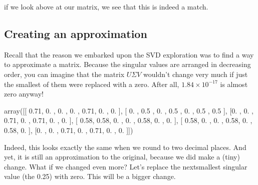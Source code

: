 \documentclass[letterpaper,10pt,english]{jupyterBook}
\begin{document}
\sphinxAtStartPar
if we look above at our  matrix, we see that this is indeed a match.


\subsection{Creating an approximation}
\label{\detokenize{chapter-16-matrices:creating-an-approximation}}
\sphinxAtStartPar
Recall that the reason we embarked upon the SVD exploration was to find a way to approximate a matrix.  Because the singular values are arranged in decreasing order, you can imagine that the matrix \(U\Sigma V\) wouldn’t change very much if just the smallest of them were replaced with a zero.  After all, \(1.84\times10^{-17}\) is almost zero anyway!

\begin{sphinxVerbatim}[commandchars=\\\{\}]
    
\PYG{p}{[}\PYG{p}{]}  
     
   
       
\end{sphinxVerbatim}

\begin{sphinxVerbatim}[commandchars=\\\{\}]
array([[ 0.71, \PYGZhy{}0.  , \PYGZhy{}0.  , \PYGZhy{}0.  ,  0.71, \PYGZhy{}0.  ,  0.  ],
       [ 0.  ,  0.5 ,  0.  ,  0.5 ,  0.  ,  0.5 ,  0.5 ],
       [\PYGZhy{}0.  , \PYGZhy{}0.  ,  0.71, \PYGZhy{}0.  ,  0.71, \PYGZhy{}0.  ,  0.  ],
       [ 0.58,  0.58, \PYGZhy{}0.  ,  0.  ,  0.58,  0.  ,  0.  ],
       [ 0.58,  0.  , \PYGZhy{}0.  ,  0.58, \PYGZhy{}0.  ,  0.58,  0.  ],
       [\PYGZhy{}0.  , \PYGZhy{}0.  ,  0.71, \PYGZhy{}0.  ,  0.71, \PYGZhy{}0.  , \PYGZhy{}0.  ]])
\end{sphinxVerbatim}

\sphinxAtStartPar
Indeed, this looks exactly the same when we round to two decimal places.  And yet, it is still an approximation to the original, because we did make a (tiny) change.  What if we changed even more?  Let’s replace the next\sphinxhyphen{}smallest singular value (the 0.25) with zero.  This will be a bigger change.
\end{document}
